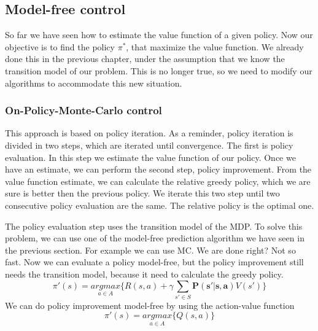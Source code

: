 \documentclass[../main.tex]{subfiles}
\begin{document}
\subsection{Model-free control}
So far we have seen how to estimate the value function of a given policy. Now our objective is to find the policy $\pi^*$, that maximize the value function. We already done this in the previous chapter, under the assumption that we know the transition model of our problem. This is no longer true, so we need to modify our algorithms to accommodate this new situation.

\subsubsection{On-Policy-Monte-Carlo control}
This approach is based on policy iteration. As a reminder, policy iteration is divided in two steps, which are iterated until convergence. The first is policy evaluation. In this step we estimate the value function of our policy. Once we have an estimate, we can perform the second step, policy improvement. From the value function estimate, we can calculate the relative greedy policy, which we are sure is better then the previous policy. We iterate this two step until two consecutive policy evaluation are the same. The relative policy is the optimal one.
\par
\noindent
The policy evaluation step uses the transition model of the MDP. To solve this problem, we can use one of the model-free prediction algorithm we have seen in the previous section. For example we can use MC. We are done right? Not so fast. Now we can evaluate a policy model-free, but the policy improvement still needs the transition model, because it need to calculate the greedy policy.
\begin{equation*}
    \pi'(s) = \underset{a \in A}{argmax} \bigg\{ R(s,a) + \gamma \sum_{s' \in S} \mathbf{P(s'|s,a)} V(s') \bigg\}
\end{equation*}
We can do policy improvement model-free by using the action-value function
\begin{equation}
    \pi'(s) = \underset{a \in A}{argmax} \bigg\{ Q(s,a) \bigg\}
\end{equation}
\end{document}
